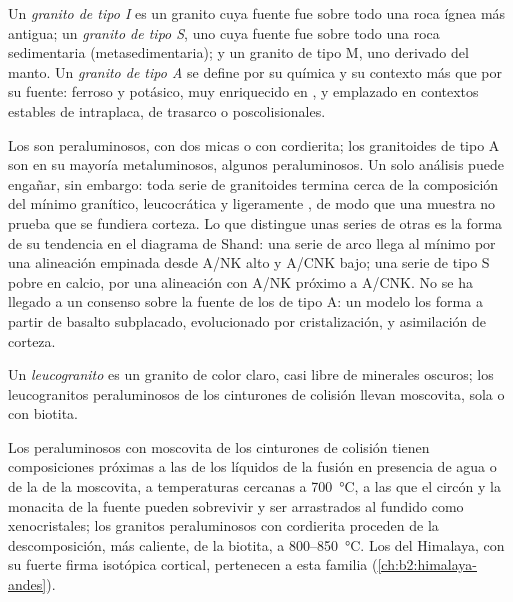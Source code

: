 \begin{definition}\label{def:b2:crustal-melting:types}
Un \emph{granito de tipo I} es un granito cuya fuente fue sobre todo una
roca ígnea más antigua; un \emph{granito de tipo S}, uno cuya fuente fue
sobre todo una roca sedimentaria (metasedimentaria); y un granito de tipo M, uno derivado
del manto. Un \emph{granito de tipo A} se define por su química y su
contexto más que por su fuente: ferroso y potásico, muy enriquecido en ,
y emplazado en contextos estables de intraplaca, de trasarco o poscolisionales.
\end{definition}

Los  son peraluminosos, con dos micas o con cordierita; los granitoides de tipo A
son en su mayoría metaluminosos, algunos peraluminosos. Un solo análisis puede engañar, sin embargo: toda
serie de granitoides termina cerca de la composición del mínimo granítico, leucocrática y ligeramente
, de modo que una muestra  no prueba que se fundiera corteza. Lo que distingue
unas series de otras es la forma de su tendencia en el diagrama de Shand: una serie de arco llega al
mínimo por una alineación empinada desde A/NK alto y A/CNK bajo; una serie de tipo S pobre en calcio,
por una alineación con A/NK próximo a A/CNK. No se ha llegado a un consenso sobre la fuente de los
 de tipo A: un modelo los forma a partir de basalto subplacado, evolucionado por cristalización,
 y asimilación de corteza.

\begin{definition}[Leucogranito]\label{def:b2:crustal-melting:leucogranite}
Un \emph{leucogranito} es un granito de color claro, casi libre de
minerales oscuros; los leucogranitos peraluminosos de los cinturones de colisión llevan moscovita, sola o
con biotita.
\end{definition}

Los  peraluminosos con moscovita de los cinturones de colisión tienen composiciones próximas
a las de los líquidos de la fusión en presencia de agua o de la  de la moscovita, a temperaturas cercanas a
\qty{700}{\celsius}, a las que el circón y la monacita de la fuente pueden sobrevivir y ser arrastrados
al fundido como xenocristales; los granitos peraluminosos con cordierita proceden de la
descomposición, más caliente, de la biotita, a 800--\qty{850}{\celsius}. Los  del Himalaya,
con su fuerte firma isotópica cortical, pertenecen a esta familia
(\cref{ch:b2:himalaya-andes}).


